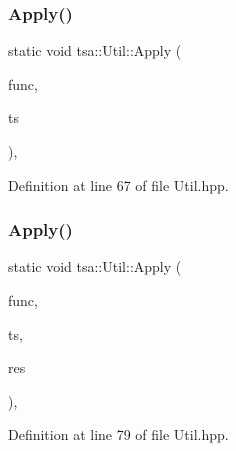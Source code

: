 \subsubsection{\texorpdfstring{Apply()}{Apply()}\hspace{0.1cm}{\footnotesize\ttfamily [1/4]}}
{\footnotesize\ttfamily static void tsa\+::\+Util\+::\+Apply (\begin{DoxyParamCaption}\item[{double($\ast$)(double)}]{func,  }\item[{\hyperlink{namespacetsa_ac599574bcc094eda25613724b8f3ca9e}{Seq\+View\+Double} \&}]{ts }\end{DoxyParamCaption})\hspace{0.3cm}{\ttfamily [inline]}, {\ttfamily [static]}}



Definition at line 67 of file Util.\+hpp.

\mbox{\label{classtsa_1_1_util_af4136a5000f4168d4ba4db40c3aa2080}} 
\subsubsection{\texorpdfstring{Apply()}{Apply()}\hspace{0.1cm}{\footnotesize\ttfamily [2/4]}}
{\footnotesize\ttfamily static void tsa\+::\+Util\+::\+Apply (\begin{DoxyParamCaption}\item[{double($\ast$)(double)}]{func,  }\item[{\hyperlink{namespacetsa_ac599574bcc094eda25613724b8f3ca9e}{Seq\+View\+Double} \&}]{ts,  }\item[{\hyperlink{namespacetsa_ac599574bcc094eda25613724b8f3ca9e}{Seq\+View\+Double} \&}]{res }\end{DoxyParamCaption})\hspace{0.3cm}{\ttfamily [inline]}, {\ttfamily [static]}}



Definition at line 79 of file Util.\+hpp.

\mbox{\label{classtsa_1_1_util_a739335d45cc8262c48457f760844b57e}} 
